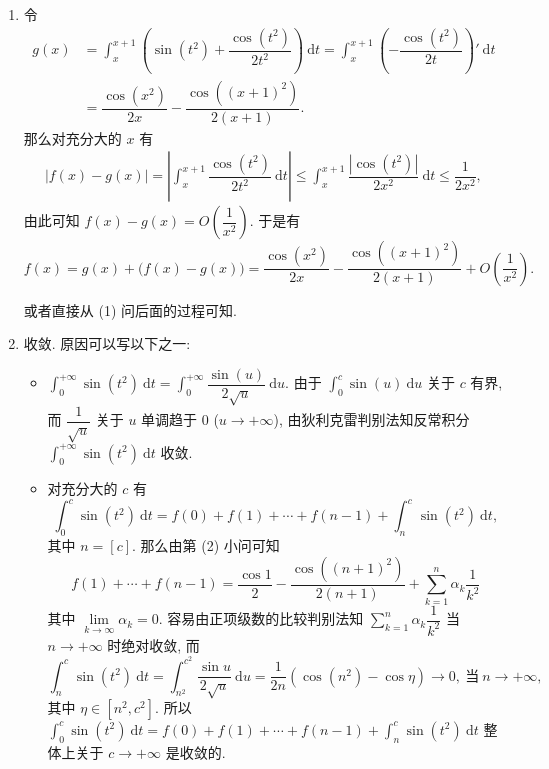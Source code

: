 \begin{solution}
\begin{enumerate}
\item 令
\begin{align*}
g(x) & = \int_x^{x+1} \left( \sin(t^2) + \dfrac{\cos(t^2)}{2t^2} \right) ~ \mathrm{d}t = \int_x^{x+1} \left( - \dfrac{\cos(t^2)}{2t} \right)' ~ \mathrm{d}t \\
& = \dfrac{\cos(x^2)}{2x} - \dfrac{\cos((x+1)^2)}{2(x+1)}.
\end{align*}
那么对充分大的 $x$ 有
\begin{align*}
\left| f(x) - g(x) \right| = \left| \int_x^{x+1} \dfrac{\cos(t^2)}{2t^2} ~ \mathrm{d}t \right| \leqslant \int_x^{x+1} \dfrac{\left| \cos(t^2) \right|}{2x^2} ~ \mathrm{d}t \leqslant \dfrac{1}{2x^2},
\end{align*}
由此可知 $\displaystyle f(x) - g(x) = O \left( \dfrac{1}{x^2} \right).$ 于是有
\[f(x) = g(x) + \big(f(x) - g(x)\big) = \dfrac{\cos(x^2)}{2x} - \dfrac{\cos((x+1)^2)}{2(x+1)} + O \left( \dfrac{1}{x^2} \right).\]

或者直接从 (1) 问后面的过程可知.

\item 收敛. 原因可以写以下之一:
\begin{itemize}
\item[\ding{43}] $\displaystyle \int_0^{+\infty} \sin(t^2) ~ \mathrm{d}t = \int_0^{+\infty} \dfrac{\sin(u)}{2\sqrt{u}} ~ \mathrm{d}u.$ 由于 $\displaystyle \int_0^c \sin(u) ~ \mathrm{d}u$ 关于 $c$ 有界, 而 $\dfrac{1}{\sqrt{u}}$ 关于 $u$ 单调趋于 $0$ ($u \to + \infty$), 由狄利克雷判别法知反常积分 $\displaystyle \int_0^{+\infty} \sin(t^2) ~ \mathrm{d}t$ 收敛.

\item[\ding{43}] 对充分大的 $c$ 有
\[\int_0^c \sin(t^2) ~ \mathrm{d}t = f(0) + f(1) + \cdots + f(n-1) + \int_n^c \sin(t^2) ~ \mathrm{d}t,\]
其中 $n = [c].$ 那么由第 (2) 小问可知
\begin{equation*}
f(1) + \cdots + f(n-1) = \dfrac{\cos 1}{2} - \dfrac{\cos((n+1)^2)}{2(n+1)} + \sum_{k=1}^n \alpha_k \dfrac{1}{k^2}
\end{equation*}
其中 $\lim\limits_{k \to \infty} \alpha_k = 0.$ 容易由正项级数的比较判别法知 $\sum\limits_{k=1}^n \alpha_k \dfrac{1}{k^2}$ 当 $n \to +\infty$ 时绝对收敛, 而
\begin{equation*}
\int_n^c \sin(t^2) ~ \mathrm{d}t = \int_{n^2}^{c^2} \dfrac{\sin u}{2\sqrt{u}} ~ \mathrm{d} u = \dfrac{1}{2n} ( \cos (n^2) - \cos \eta) \to 0, ~ \text{当} ~ n \to +\infty,
\end{equation*}
其中 $\eta \in [n^2, c^2].$ 所以 $\displaystyle \int_0^c \sin(t^2) ~ \mathrm{d}t = f(0) + f(1) + \cdots + f(n-1) + \int_n^c \sin(t^2) ~ \mathrm{d}t$ 整体上关于 $c \to +\infty$ 是收敛的.
\end{itemize}
\end{enumerate}
\end{solution}


